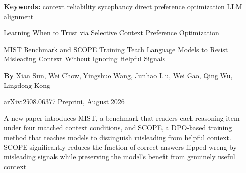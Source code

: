 \documentclass[10pt,twocolumn]{article}
\begin{document}
\setlength{\parindent}{0pt}
\setlength{\parskip}{4pt}

{\small\color{keywordgray}\textbf{Keywords:}
  context reliability \textbullet{}
  sycophancy \textbullet{}
  direct preference optimization \textbullet{}
  LLM alignment}\par\vspace{4pt}

{\LARGE\bfseries\raggedright
  Learning When to Trust via Selective Context
  Preference Optimization}\par\vspace{4pt}

{\large\itshape\raggedright
  MIST Benchmark and SCOPE Training Teach Language Models
  to Resist Misleading Context Without Ignoring Helpful Signals}\par\vspace{6pt}

{\small\textbf{By} Xian Sun, Wei Chow, Yingshuo Wang, Junhao Liu,
  Wei Gao, Qing Wu, Lingdong Kong}\par\vspace{2pt}

{\small\color{keywordgray}arXiv:2608.06377 \textbullet{} Preprint, August 2026}
\par\vspace{2pt}\noindent{\color{rulered}\rule{\columnwidth}{0.6pt}}\vspace{6pt}

A new paper introduces MIST, a benchmark that renders each reasoning item under
four matched context conditions, and SCOPE, a DPO-based training method that teaches
models to distinguish misleading from helpful context. SCOPE significantly reduces
the fraction of correct answers flipped wrong by misleading signals while preserving
the model's benefit from genuinely useful context.
\end{document}
